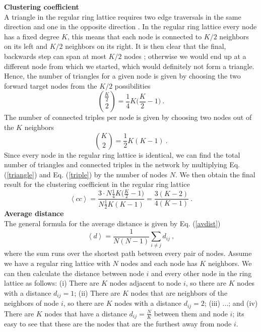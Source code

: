 \documentclass[11 pt , letterpaper , twoside , openright]{book}
\begin{document}
\textbf{Clustering coefficient}\\
\newline
A triangle in the regular ring lattice requires two edge traversals in the same direction and one in the opposite direction \cite{Pele2015}. In the regular ring lattice every node has a fixed degree $K$, this means that each node is connected to $K/2$ neighbors on its left and $K/2$ neighbors on its right. It is then clear that the final, backwards step can span at most $K/2$ nodes \cite{Pele2015}; otherwise we would end up at a different node from which we started, which would definitely not form a triangle.\\
\newline
Hence, the number of triangles for a given node is given by choosing the two forward target nodes from the $K/2$ possibilities \cite{Pele2015}
\begin{equation}\label{triangle}
	\binom{\frac{K}{2}}{2} = \frac{1}{4} K \bigg(\frac{K}{2} - 1 \bigg) \ .
\end{equation}
The number of connected triples per node is given by choosing two nodes out of the $K$ neighbors \cite{Pele2015}
\begin{equation}\label{triple}
	\binom{K}{2} = \frac{1}{2} K (K-1) \ .
\end{equation}
Since every node in the regular ring lattice is identical, we can find the total number of triangles and connected triples in the network by multiplying Eq. (\ref{triangle}) and Eq. (\ref{triple}) by the number of nodes $N$. We then obtain the final result for the clustering coefficient in the regular ring lattice \cite{Pele2015}
\begin{equation}
	\left<cc\right> = \frac{3\cdot N \frac{1}{4} K \big(\frac{K}{2} - 1 \big)}{N \frac{1}{2} K (K-1)} = \frac{3(K-2)}{4(K-1)} \ .
\end{equation}
\newline
\textbf{Average distance}\\
\newline
The general formula for the average distance is given by Eq. (\ref{avdist})
\begin{equation}
	\left<d\right> = \frac{1}{N(N-1)} \sum_{i \neq j} d_{ij} \ ,
\end{equation}
where the sum runs over the shortest path between every pair of nodes. Assume we have a regular ring lattice with $N$ nodes and each node has $K$ neighbors. We can then calculate the distance between node $i$ and every other node in the ring lattice as follows: (i) There are $K$ nodes adjacent to node $i$, so there are $K$ nodes with a distance $d_{ij} = 1$; (ii) There are $K$ nodes that are neighbors of the neighbors of node $i$, so there are $K$ nodes with a distance $d_{ij} = 2$; (iii) ...; and (iv) There are $K$ nodes that have a distance $d_{ij} = \frac{N}{K}$ between them and node $i$; its easy to see that these are the nodes that are the furthest away from node $i$.\\
\end{document}

